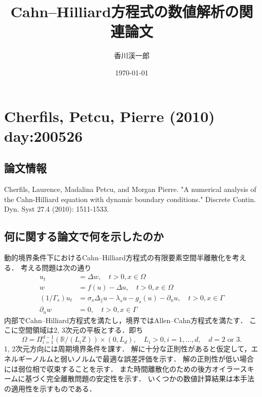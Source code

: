 \documentclass[openary, a4paper, oneside]{jsarticle}
\begin{document}
\title{Cahn--Hilliard方程式の数値解析の関連論文}
\author{香川渓一郎}
\date{\today}
\maketitle
\setcounter{tocdepth}{1}
\tableofcontents

\newpage
\section{Cherfils, Petcu, Pierre (2010) day:200526}
  \subsection{論文情報}
  Cherfils, Laurence, Madalina Petcu, and Morgan Pierre. "A numerical analysis of the Cahn-Hilliard equation with dynamic boundary conditions." Discrete Contin. Dyn. Syst 27.4 (2010): 1511-1533.
  \subsection{何に関する論文で何を示したのか}
  動的境界条件下におけるCahn--Hilliard方程式の有限要素空間半離散化を考える．
  考える問題は次の通り
  \begin{equation}
    \begin{aligned}
    u_{t} &=\Delta w, \quad t>0, x \in \Omega \\
    w &=f(u)-\Delta u, \quad t>0, x \in \Omega \\
    \left(1 / \Gamma_{s}\right) u_{t} &=\sigma_{s} \Delta_{\|} u-\lambda_{s} u-g_{s}(u)-\partial_{n} u, \quad t>0, x \in \Gamma \\
    \partial_{n} w &=0, \quad t>0, x \in \Gamma
    \end{aligned}
  \end{equation}
  内部でCahn--Hilliard方程式を満たし，境界ではAllen--Cahn方程式を満たす．
  ここに空間領域は2, 3次元の平板とする．即ち
  \begin{equation}
    \Omega=\Pi_{i=1}^{d-1}\left(\mathbb{R} /\left(L_{i} \mathbb{Z}\right)\right) \times\left(0, L_{d}\right), \quad L_{i}>0, i=1, \ldots, d, \quad d=2 \text { or } 3.
  \end{equation}
  1, 2次元方向には周期境界条件を課す．
  解に十分な正則性があると仮定して，エネルギーノルムと弱いノルムで最適な誤差評価を示す．
  解の正則性が低い場合には弱位相で収束することを示す．
  また時間離散化のための後方オイラースキームに基づく完全離散問題の安定性を示す．
  いくつかの数値計算結果は本手法の適用性を示すものである．
\end{document}
